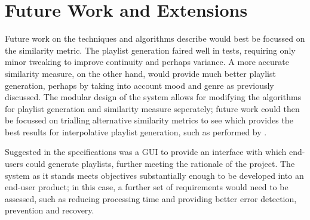 \section{Future Work and Extensions}
Future work on the techniques and algorithms describe would best be focussed on the similarity metric. The playlist generation faired well in tests, requiring only minor tweaking to improve continuity and perhaps variance. A more accurate similarity measure, on the other hand, would provide much better playlist generation, perhaps by taking into account mood and genre as previously discussed. The modular design of the system allows for modifying the algorithms for playlist generation and similarity measure seperately; future work could then be focussed on trialling alternative similarity metrics to see which provides the best results for interpolative playlist generation, such as performed by \citet*{Berenzweig2003}. 

Suggested in the specifications was a GUI to provide an interface with which end-users could generate playlists, further meeting the rationale of the project. The system as it stands meets objectives substantially enough to be developed into an end-user product; in this case, a further set of requirements would need to be assessed, such as reducing processing time and providing better error detection, prevention and recovery.
